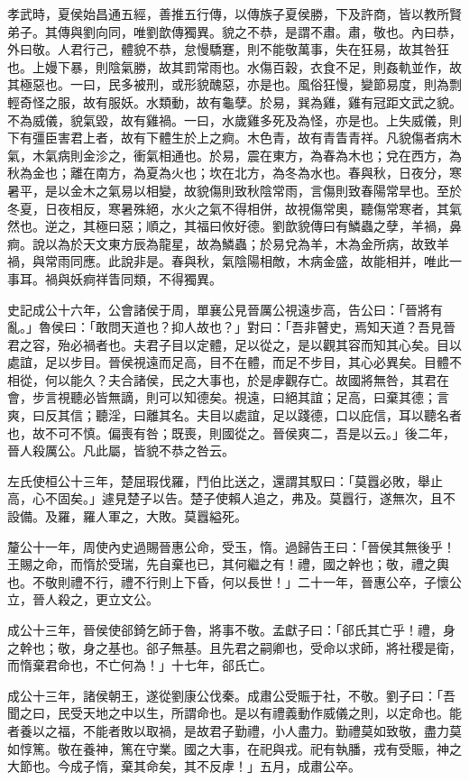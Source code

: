 \begin{pinyinscope}
孝武時，夏侯始昌通五經，善推五行傳，以傳族子夏侯勝，下及許商，皆以教所賢弟子。其傳與劉向同，唯劉歆傳獨異。貌之不恭，是謂不肅。肅，敬也。內曰恭，外曰敬。人君行己，體貌不恭，怠慢驕蹇，則不能敬萬事，失在狂易，故其咎狂也。上嫚下暴，則陰氣勝，故其罰常雨也。水傷百穀，衣食不足，則姦軌並作，故其極惡也。一曰，民多被刑，或形貌醜惡，亦是也。風俗狂慢，變節易度，則為剽輕奇怪之服，故有服妖。水類動，故有龜孽。於易，巽為雞，雞有冠距文武之貌。不為威儀，貌氣毀，故有雞禍。一曰，水歲雞多死及為怪，亦是也。上失威儀，則下有彊臣害君上者，故有下體生於上之痾。木色青，故有青眚青祥。凡貌傷者病木氣，木氣病則金沴之，衝氣相通也。於易，震在東方，為春為木也；兌在西方，為秋為金也；離在南方，為夏為火也；坎在北方，為冬為水也。春與秋，日夜分，寒暑平，是以金木之氣易以相變，故貌傷則致秋陰常雨，言傷則致春陽常旱也。至於冬夏，日夜相反，寒暑殊絕，水火之氣不得相併，故視傷常奧，聽傷常寒者，其氣然也。逆之，其極曰惡；順之，其福曰攸好德。劉歆貌傳曰有鱗蟲之孽，羊禍，鼻痾。說以為於天文東方辰為龍星，故為鱗蟲；於易兌為羊，木為金所病，故致羊禍，與常雨同應。此說非是。春與秋，氣陰陽相敵，木病金盛，故能相并，唯此一事耳。禍與妖痾祥眚同類，不得獨異。

史記成公十六年，公會諸侯于周，單襄公見晉厲公視遠步高，告公曰：「晉將有亂。」魯侯曰：「敢問天道也？抑人故也？」對曰：「吾非瞽史，焉知天道？吾見晉君之容，殆必禍者也。夫君子目以定體，足以從之，是以觀其容而知其心矣。目以處誼，足以步目。晉侯視遠而足高，目不在體，而足不步目，其心必異矣。目體不相從，何以能久？夫合諸侯，民之大事也，於是虖觀存亡。故國將無咎，其君在會，步言視聽必皆無謫，則可以知德矣。視遠，曰絕其誼；足高，曰棄其德；言爽，曰反其信；聽淫，曰離其名。夫目以處誼，足以踐德，口以庇信，耳以聽名者也，故不可不慎。偏喪有咎；既喪，則國從之。晉侯爽二，吾是以云。」後二年，晉人殺厲公。凡此屬，皆貌不恭之咎云。

左氏使桓公十三年，楚屈瑕伐羅，鬥伯比送之，還謂其馭曰：「莫囂必敗，舉止高，心不固矣。」遽見楚子以告。楚子使賴人追之，弗及。莫囂行，遂無次，且不設備。及羅，羅人軍之，大敗。莫囂縊死。

釐公十一年，周使內史過賜晉惠公命，受玉，惰。過歸告王曰：「晉侯其無後乎！王賜之命，而惰於受瑞，先自棄也已，其何繼之有！禮，國之幹也；敬，禮之輿也。不敬則禮不行，禮不行則上下昏，何以長世！」二十一年，晉惠公卒，子懷公立，晉人殺之，更立文公。

成公十三年，晉侯使郤錡乞師于魯，將事不敬。孟獻子曰：「郤氏其亡乎！禮，身之幹也；敬，身之基也。郤子無基。且先君之嗣卿也，受命以求師，將社稷是衛，而惰棄君命也，不亡何為！」十七年，郤氏亡。

成公十三年，諸侯朝王，遂從劉康公伐秦。成肅公受賑于社，不敬。劉子曰：「吾聞之曰，民受天地之中以生，所謂命也。是以有禮義動作威儀之則，以定命也。能者養以之福，不能者敗以取禍，是故君子勤禮，小人盡力。勤禮莫如致敬，盡力莫如惇篤。敬在養神，篤在守業。國之大事，在祀與戎。祀有執膰，戎有受賑，神之大節也。今成子惰，棄其命矣，其不反虖！」五月，成肅公卒。


\end{pinyinscope}
